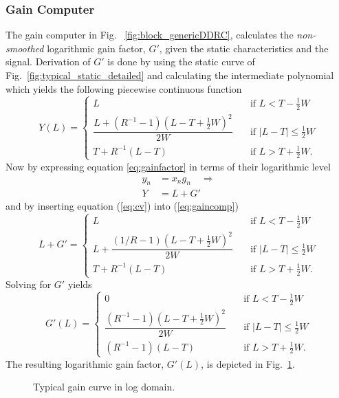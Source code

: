 \documentclass[../main2.tex]{subfiles}
\providecommand{\rootdir}{..}
\begin{document}
\subsubsection{Gain Computer} \label{gain_computer}
The gain computer in Fig. ~\ref{fig:block_genericDDRC}, calculates the \emph{non-smoothed} logarithmic gain factor, $G'$, given the static characteristics and the signal. Derivation of $G'$ is done by using the static curve of Fig.~\ref{fig:typical_static_detailed} and calculating the intermediate polynomial which yields the following piecewise continuous function
\begin{equation} \label{eq:gaincomp}
Y(L) = \begin{cases}
    L & \quad \text{if }L<T-\frac{1}{2}W \\[0.8em]
    \dfrac{L+(R^{-1}-1)(L-T+\frac{1}{2}W)^2}{2W}& \quad \text{if } |L-T| \leq \frac{1}{2}W\\[1.2em]
    T+ R^{-1}(L-T) & \quad \text{if } L > T + \frac{1}{2}W.
\end{cases}
\end{equation}
Now  by expressing equation \eqref{eq:gainfactor} in terms of their logarithmic level
\begin{align}
y_n &= x_ng_n  \quad \Rightarrow \\
Y &= L + G' \label{eq:cv}
\end{align}
and by inserting equation (\ref{eq:cv}) into (\ref{eq:gaincomp})
\begin{equation}
L+G' = \begin{cases}
    L & \quad \text{if }L < T-\frac{1}{2}W \\[0.8em]
    L + \dfrac{(1/R-1)(L-T+\frac{1}{2}W)^2}{2W}& \quad \text{if } |L-T| \leq \frac{1}{2}W\\[1.2em]
    T+ R^{-1}(L-T) & \quad \text{if } L > T + \frac{1}{2}W.
\end{cases}
\end{equation}
Solving for $G'$ yields
\begin{equation} \label{eq:gain}
G'(L) = \begin{cases}
    0 & \quad \text{if }L <T -\frac{1}{2}W \\[0.8em]
    \dfrac{(R^{-1}-1)(L-T+\frac{1}{2}W)^2}{2W}& \quad \text{if } |L-T| \leq \frac{1}{2}W\\[1.2em]
    \left(R^{-1}-1\right)\left(L-T\right) & \quad \text{if } L > T + \frac{1}{2}W.
 \end{cases}
\end{equation}
The resulting logarithmic gain factor, $G'(L)$, is depicted in Fig.~\ref{fig:typical_gain_detailed}.
\begin{figure}[h]
\centerline{}
\caption{Typical gain curve in log domain.}
\label{fig:typical_gain_detailed}
\end{figure}
\end{document}
